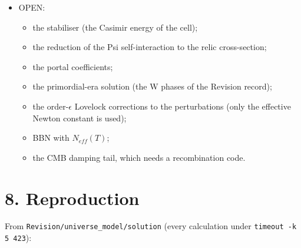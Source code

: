 \documentclass[11pt]{article}
\begin{document}
\begin{itemize}
\begin{itemize}
\item The S parameter of the Higgsless tip is not computed (OPEN).
\item One generation makes $N_{eff}$ fit only for a decoupling inside the QCD crossover (whole-cell count, $g_F = 8$), or naturally with the one-half count ($g_F = 4$, section 6).
\item The cosmological term needs $\delta\Lambda/H^2 \approx 7.5\times10^{-93}$ (the cosmological-constant problem, unsolved here). No state of $\Psi$ can stand in for it (\texttt{ANALYSIS.\allowbreak{}md} section 9).
\item (1.1) If the vector portal that gives $N_{eff} = 2.99$ acts on the dark matter with its $x_0$ overlap, the dark matter is under-abundant ($\Omega h^2 = 0.023$) and $\sigma_{SI}$ is 1.6 times the LZ limit (\texttt{ANALYSIS.\allowbreak{}md} section 8.5): the portal coefficients must differ between $\Psi$ modes, or the one-half count must hold. (1.2) Resolved in UM-1 version 1.3 by the lepton-only P1: $\Omega h^2 = 0.115$ predicted, $\sigma_{SI} = 8\times10^{-50}$ cm$^2$ (\texttt{GAPS.\allowbreak{}md} section 3).
\end{itemize}
\item OPEN:
\begin{itemize}
\item the stabiliser (the Casimir energy of the cell);
\item the reduction of the Psi self-interaction to the relic cross-section;
\item the portal coefficients;
\item the primordial-era solution (the W phases of the Revision record);
\item the order-$\epsilon$ Lovelock corrections to the perturbations (only the effective Newton constant is used);
\item BBN with $N_{eff}(T)$;
\item the CMB damping tail, which needs a recombination code.
\end{itemize}
\end{itemize}

\section*{8. Reproduction}

From \texttt{Revision/\allowbreak{}universe\_\allowbreak{}model/\allowbreak{}solution} (every calculation under \texttt{timeout -{}\allowbreak{}k 5 423}):
\end{document}
